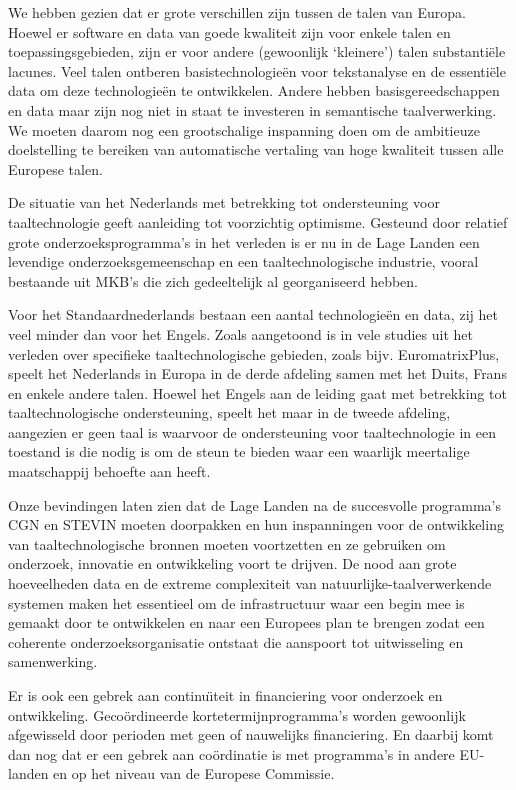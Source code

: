 \documentclass[]{../../metanetpaper}
\begin{document}
\begin{multicols}{2}
{    We hebben gezien dat er grote verschillen zijn tussen de talen van Europa. Hoewel er software en data van goede kwaliteit zijn voor enkele talen en toepassingsgebieden, zijn er voor andere (gewoonlijk `kleinere') talen substanti{\"e}le lacunes. Veel talen ontberen basistechnologie{\"e}n voor tekstanalyse en de essenti{\"e}le data om deze technologie{\"e}n te ontwikkelen. Andere hebben basisgereedschappen en data maar zijn nog niet in staat te investeren in semantische taalverwerking. We moeten daarom nog een grootschalige inspanning doen om de ambitieuze doelstelling te bereiken van automatische vertaling van hoge kwaliteit tussen alle Europese talen.

    De situatie van het Nederlands met betrekking tot ondersteuning voor taaltechnologie geeft aanleiding tot voorzichtig optimisme. Gesteund door relatief grote onderzoeksprogramma's in het verleden is er nu in de Lage Landen een levendige onderzoeksgemeenschap en een taaltechnologische industrie, vooral bestaande uit MKB's die zich gedeeltelijk al georganiseerd hebben.

    Voor het Standaardnederlands bestaan een aantal technologie{\"e}n en data, zij het veel minder dan voor het Engels. Zoals aangetoond is in vele studies uit het verleden over specifieke taaltechnologische gebieden, zoals bijv. EuromatrixPlus, speelt het Nederlands in Europa in de derde afdeling samen met het Duits, Frans en enkele andere talen. Hoewel het Engels aan de leiding gaat met betrekking tot taaltechnologische ondersteuning, speelt het  maar in de tweede afdeling, aangezien er geen taal is waarvoor de ondersteuning voor taaltechnologie  in een toestand is die nodig is om de steun te bieden waar een waarlijk meertalige maatschappij behoefte aan heeft.

    Onze bevindingen laten zien dat de Lage Landen na de succesvolle programma's CGN en STEVIN moeten doorpakken en hun inspanningen voor de ontwikkeling van taaltechnologische bronnen moeten voortzetten en ze gebruiken om onderzoek, innovatie en ontwikkeling voort te drijven. De nood aan grote hoeveelheden data en de extreme complexiteit van natuurlijke-taalverwerkende systemen maken het essentieel om de infrastructuur waar een begin mee is gemaakt door te ontwikkelen en naar een Europees plan te brengen zodat een coherente onderzoeksorganisatie ontstaat die aanspoort tot uitwisseling en samenwerking.

    Er is ook een gebrek aan continu{\"\i}teit in financiering voor onderzoek en ontwikkeling. Geco{\"o}rdineerde kortetermijnprogramma's worden gewoonlijk afgewisseld door perioden met geen of nauwelijks financiering. En daarbij komt dan nog dat er een gebrek aan co{\"o}rdinatie is met programma's in andere EU-landen en op het niveau van de Europese Commissie.

}
\end{multicols}
\end{document}
